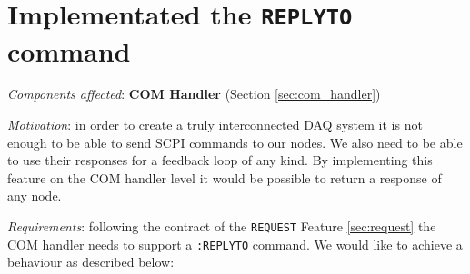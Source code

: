 \section{Implementated the \texttt{REPLYTO} command}
\label{sec:replyto}

\textit{Components affected}: \textbf{COM Handler} (Section \ref{sec:com_handler})

\textit{Motivation}: in order to create a truly interconnected DAQ system it is not enough to be able to send SCPI commands to our nodes. We also need to be able to use their responses for a feedback loop of any kind. By implementing this feature on the COM handler level it  would be possible to return a response of any node.

\textit{Requirements}: following the contract of the \texttt{REQUEST} Feature \ref{sec:request} the COM handler needs to support a \texttt{:REPLYTO} command. We would like to achieve a behaviour as described below:

